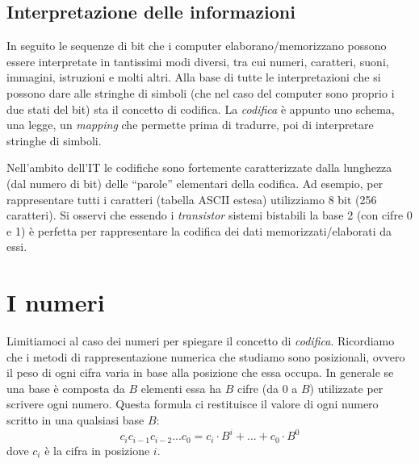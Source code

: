 \documentclass[class=book, crop=false, oneside]{standalone}
\begin{document}
\subsection{Interpretazione delle informazioni} In seguito le sequenze di bit che i computer elaborano/memorizzano possono essere interpretate in tantissimi modi diversi, tra cui numeri, caratteri, suoni, immagini, istruzioni e molti altri. Alla base di tutte le interpretazioni che si possono dare alle stringhe di simboli (che nel caso del computer sono proprio i due stati del bit) sta il concetto di codifica. La \emph{codifica} è appunto uno schema, una legge, un \emph{mapping} che permette prima di tradurre, poi di interpretare stringhe di simboli.

Nell’ambito dell’IT le codifiche sono fortemente caratterizzate dalla lunghezza (dal numero di bit) delle “parole” elementari della codifica. Ad esempio, per rappresentare tutti i caratteri (tabella ASCII estesa) utilizziamo  8 bit (256 caratteri). Si osservi che essendo i \emph{transistor} sistemi bistabili la base 2 (con cifre 0 e 1) è perfetta per rappresentare la codifica dei dati memorizzati/elaborati da essi.

\section{I numeri}
Limitiamoci al caso dei numeri per spiegare il concetto di \emph{codifica}. Ricordiamo che i metodi di rappresentazione numerica che studiamo sono posizionali, ovvero il peso di ogni cifra varia in base alla posizione che essa occupa. In generale se una base è composta da \(B\) elementi essa ha \(B\) cifre (da 0 a \(B\)) utilizzate per scrivere ogni numero. Questa formula ci restituisce il valore di ogni numero scritto in una qualsiasi base \(B\):
\begin{equation*}
	c_{i} c_{i-1} c_{i-2}... c_{0}=c_{i}\cdot B^{i}+...+c_{0}\cdot B^{0}
\end{equation*}
dove \(c_{i}\) è la cifra in posizione \(i\).
\end{document}

